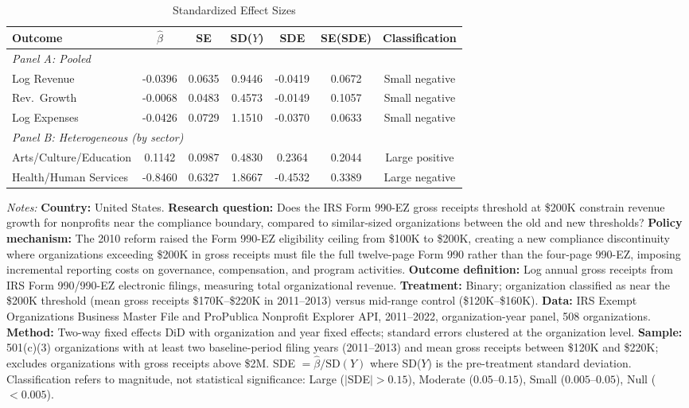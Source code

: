 \begin{table}[htbp]
\centering
\caption{Standardized Effect Sizes}
\label{tab:sde}
\begin{tabular}{lcccccc}
\hline\hline
Outcome & $\hat{\beta}$ & SE & SD($Y$) & SDE & SE(SDE) & Classification \\
\hline
\multicolumn{7}{l}{\textit{Panel A: Pooled}} \\
Log Revenue & -0.0396 & 0.0635 & 0.9446 & -0.0419 & 0.0672 & Small negative \\
Rev.\ Growth & -0.0068 & 0.0483 & 0.4573 & -0.0149 & 0.1057 & Small negative \\
Log Expenses & -0.0426 & 0.0729 & 1.1510 & -0.0370 & 0.0633 & Small negative \\
\hline
\multicolumn{7}{l}{\textit{Panel B: Heterogeneous (by sector)}} \\
Arts/\allowbreak Culture/\allowbreak Education & 0.1142 & 0.0987 & 0.4830 & 0.2364 & 0.2044 & Large positive \\
Health/\allowbreak Human Services & -0.8460 & 0.6327 & 1.8667 & -0.4532 & 0.3389 & Large negative \\

\hline\hline
\end{tabular}
\begin{tablenotes}
\item \textit{Notes:} \textbf{Country:} United States. \textbf{Research question:} Does the IRS Form 990-EZ gross receipts threshold at \$200K constrain revenue growth for nonprofits near the compliance boundary, compared to similar-sized organizations between the old and new thresholds? \textbf{Policy mechanism:} The 2010 reform raised the Form 990-EZ eligibility ceiling from \$100K to \$200K, creating a new compliance discontinuity where organizations exceeding \$200K in gross receipts must file the full twelve-page Form 990 rather than the four-page 990-EZ, imposing incremental reporting costs on governance, compensation, and program activities. \textbf{Outcome definition:} Log annual gross receipts from IRS Form 990/990-EZ electronic filings, measuring total organizational revenue. \textbf{Treatment:} Binary; organization classified as near the \$200K threshold (mean gross receipts \$170K--\$220K in 2011--2013) versus mid-range control (\$120K--\$160K). \textbf{Data:} IRS Exempt Organizations Business Master File and ProPublica Nonprofit Explorer API, 2011--2022, organization-year panel, 508 organizations. \textbf{Method:} Two-way fixed effects DiD with organization and year fixed effects; standard errors clustered at the organization level. \textbf{Sample:} 501(c)(3) organizations with at least two baseline-period filing years (2011--2013) and mean gross receipts between \$120K and \$220K; excludes organizations with gross receipts above \$2M. SDE $= \hat{\beta} / \text{SD}(Y)$ where SD($Y$) is the pre-treatment standard deviation. Classification refers to magnitude, not statistical significance: Large ($|$SDE$| > 0.15$), Moderate ($0.05$--$0.15$), Small ($0.005$--$0.05$), Null ($< 0.005$).
\end{tablenotes}
\end{table}
